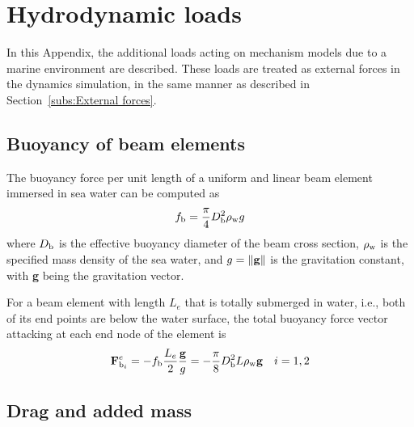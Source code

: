 %
%

%
%

\def\rhow{\rho_{\rm w}}
\def\Db{D_{\rm b}}
\def\Dd{D_{\rm d}}
\def\Cd{C_{\rm d}}
\def\Ca{C_{\rm a}}
\def\Cm{C_{\rm m}}
\def\Cda{C_{\rm d,axial}}
\def\Caa{C_{\rm a,axial}}
\def\Cma{C_{\rm m,axial}}

\chapter{Hydrodynamic loads}
\label{chap:Hydrodynamics}

In this Appendix, the additional loads acting on mechanism models due to a
marine environment are described.
These loads are treated as external forces in the dynamics simulation, in the
same manner as described in Section~\ref{subs:External forces}.

\section{Buoyancy of beam elements}

The buoyancy force per unit length of a uniform and linear beam element immersed
in sea water can be computed as
%
\begin{equation}
\label{eq:buoyancy force}
f_{\rm b} = \frac{\pi}{4}\Db^2 \rhow g
\end{equation}
%
where $\Db$ is the effective buoyancy diameter of the beam cross section,
$\rhow$ is the specified mass density of the sea water, and $g=\|{\bf g}\|$
is the gravitation constant, with {\bf g} being the gravitation vector.

For a beam element with length $L_e$ that is totally submerged in water, i.e.,
both of its end points are below the water surface, the total buoyancy force
vector attacking at each end node of the element is
%
\begin{equation}
{\bf F}_{{\rm b}_i}^e = -f_{\rm b} \frac{L_e}{2} \frac{\bf g}{g} =
-\frac{\pi}{8}\Db^2 L \rhow {\bf g} \quad i=1,2
\end{equation}

\section{Drag and added mass}

